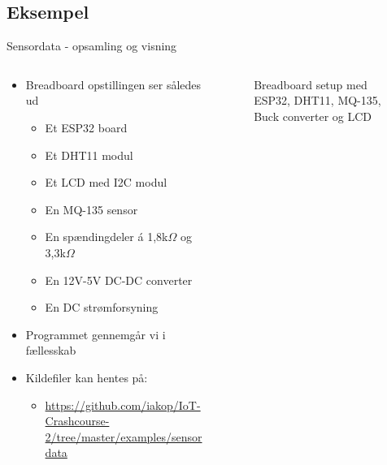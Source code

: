 \documentclass[aspectratio=169]{beamer}
\begin{document}
\subsection{Eksempel}
\begin{frame}{Sensordata - opsamling og visning}
\begin{columns}
	\begin{column}{0.5\textwidth}
		\begin{textBox}
		\begin{itemize}
			\item Breadboard opstillingen ser således ud
			\begin{itemize}
				\item Et ESP32 board
				\item Et DHT11 modul
				\item Et LCD med I2C modul
				\item En MQ-135 sensor
				\item En spændingdeler á 1,8{\textsf{k$\Omega$}} og 3,3{\textsf{k$\Omega$}}
				\item En 12V-5V DC-DC converter
				\item En DC strømforsyning
			\end{itemize}
			\item Programmet gennemgår vi i fællesskab
			\item Kildefiler kan hentes på:
			\begin{itemize}
				\item \tiny\url{https://github.com/iakop/IoT-Crashcourse-2/tree/master/examples/sensordata}
			\end{itemize}
		\end{itemize}
		\end{textBox}
	\end{column}
	\begin{column}{0.5\textwidth}
		\centering
		\begin{figure}
  			
  			\caption{Breadboard setup med ESP32, DHT11, MQ-135, Buck converter og LCD}
  			\label{fig:sensordata}
		\end{figure}
	\end{column}
\end{columns}
\end{frame}
\end{document}
